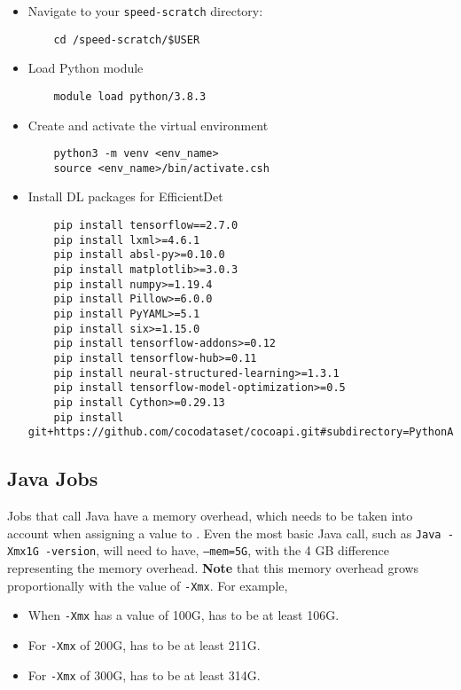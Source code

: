 \begin{itemize}
  \item Navigate to your \texttt{speed-scratch} directory:
  \begin{verbatim}
	cd /speed-scratch/$USER
  \end{verbatim}
  \item Load Python module
  \begin{verbatim}
	module load python/3.8.3
  \end{verbatim}
  \item Create and activate the virtual environment
  \begin{verbatim}
	python3 -m venv <env_name>
	source <env_name>/bin/activate.csh
  \end{verbatim}
  \item Install DL packages for EfficientDet
  \small
  \begin{verbatim}
	pip install tensorflow==2.7.0
	pip install lxml>=4.6.1
	pip install absl-py>=0.10.0
	pip install matplotlib>=3.0.3
	pip install numpy>=1.19.4
	pip install Pillow>=6.0.0
	pip install PyYAML>=5.1
	pip install six>=1.15.0
	pip install tensorflow-addons>=0.12
	pip install tensorflow-hub>=0.11
	pip install neural-structured-learning>=1.3.1
	pip install tensorflow-model-optimization>=0.5
	pip install Cython>=0.29.13
	pip install git+https://github.com/cocodataset/cocoapi.git#subdirectory=PythonAPI
	\end{verbatim}
  \normalsize
\end{itemize}

\subsection{Java Jobs}
\label{sect:java}

Jobs that call Java have a memory overhead, which needs to be taken 
into account when assigning a value to . Even the most basic 
Java call, such as \texttt{Java -Xmx1G -version}, will need to have,
\texttt{--mem=5G}, with the 4 GB difference representing the memory overhead. 
\textbf{Note} that this memory overhead grows proportionally with the value of
\texttt{-Xmx}. For example,

\begin{itemize}
  \item When \texttt{-Xmx} has a value of 100G,  has to be at least 106G.
  \item For \texttt{-Xmx} of 200G,  has to be at least 211G.
  \item For \texttt{-Xmx} of 300G,  has to be at least 314G.
\end{itemize}

